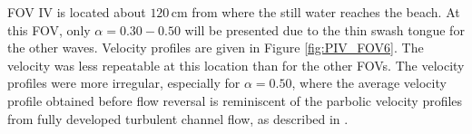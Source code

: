 \documentclass[review, authoryear]{elsarticle}
\newcommand{\cm}{\,\mbox{cm}}
\begin{document}
 FOV IV is located about $120\cm$ from where the still water reaches the beach. At this FOV, only $\alpha=0.30-0.50$ will be presented due to the thin swash tongue for the other waves. Velocity profiles are given in Figure \ref{fig:PIV_FOV6}. The velocity was less repeatable at this location than for the other FOVs. The velocity profiles were more irregular, especially for $\alpha=0.50$, where the average velocity profile obtained before flow reversal is reminiscent of the parbolic velocity profiles from fully developed turbulent channel flow, as described in \cite{white2006viscous}. 
  
\begin{figure}[]
\centering
{}
\end{figure}
\end{document}
